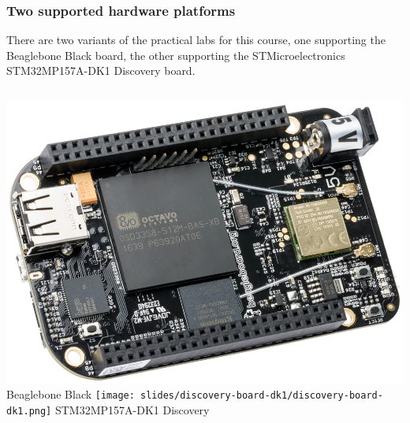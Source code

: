 \begin{frame}
\frametitle{Two supported hardware platforms}
  There are two variants of the practical labs for this course, one
  supporting the Beaglebone Black board, the other supporting the
  STMicroelectronics STM32MP157A-DK1 Discovery board.
  \vfill
  \begin{columns}
    \includegraphics[height=0.5\textheight]{slides/beagleboneblack-board/beagleboneblack.png}
    \newline
    Beaglebone Black
    \texttt{[image: slides/discovery-board-dk1/discovery-board-dk1.png]}
    \newline
    STM32MP157A-DK1 Discovery
  \end{columns}
\end{frame}

